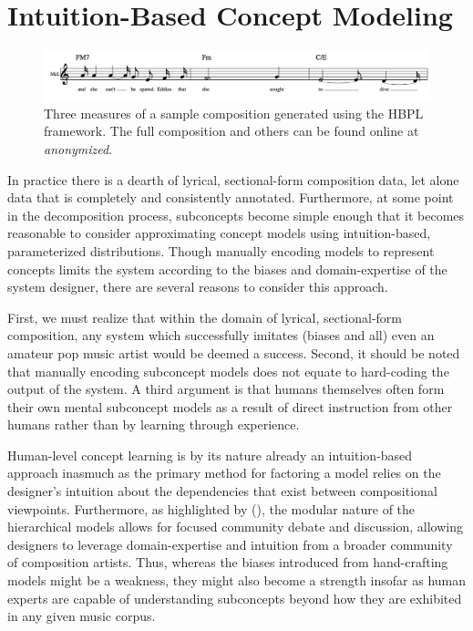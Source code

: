 \documentclass[letterpaper]{article}
\begin{document}
\section{Intuition-Based Concept Modeling}
\begin{figure}[t]
	\centering
	\includegraphics[width=.82\linewidth]{example}
	\caption{\label{fig:example_composition} Three measures of a sample composition generated using the HBPL framework. The full composition and others can be found online at \emph{anonymized}.}
\end{figure}
In practice there is a dearth of lyrical, sectional-form composition data, let alone data that is completely and consistently annotated. Furthermore, at some point in the decomposition process, subconcepts become simple enough that it becomes reasonable to consider approximating concept models using intuition-based, parameterized distributions. Though manually encoding models to represent concepts limits the system according to the biases and domain-expertise of the system designer, there are several reasons to consider this approach.

First, we must realize that within the domain of lyrical, sectional-form composition, any system which successfully imitates (biases and all) even an amateur pop music artist would be deemed a success. Second, it should be noted that manually encoding subconcept models does not equate to hard-coding the output of the system. A third argument is that humans themselves often form their own mental subconcept models as a result of direct instruction from other humans rather than by learning through experience.

Human-level concept learning is by its nature already an intuition-based approach inasmuch as the primary method for factoring a model relies on the designer's intuition about the dependencies that exist between compositional viewpoints. Furthermore, as highlighted by \citeauthor{bodily2017Mume} (\citeyear{bodily2017Mume}), the modular nature of the hierarchical models allows for focused community debate and discussion, allowing designers to leverage domain-expertise and intuition from a broader community of composition artists. Thus, whereas the biases introduced from hand-crafting models might be a weakness, they might also become a strength insofar as human experts are capable of understanding subconcepts beyond how they are exhibited in any given music corpus.
\end{document}
